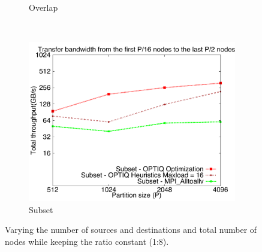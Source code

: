 \begin{figure}[!htbp]
\begin{subfigure}[b]{0.32\textwidth}
                \caption{Overlap}
                \label{fig:constantr_27}
        \end{subfigure}
        ~ %
        \begin{subfigure}[b]{0.32\textwidth}
                \includegraphics[width=\textwidth]{figures/constantr_87}
                \caption{Subset}
                \label{fig:constantr_87}
        \end{subfigure}
        \caption{Varying the number of sources and destinations and total number of nodes while keeping the ratio constant (1:8).}
        \label{fig:constantr}
\end{figure}

